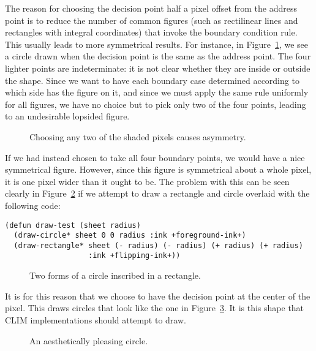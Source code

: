 The reason for choosing the decision point half a pixel offset from the address
point is to reduce the number of common figures (such as rectilinear lines and
rectangles with integral coordinates) that invoke the boundary condition rule.
This usually leads to more symmetrical results.  For instance, in
Figure~\ref{corner-circle}, we see a circle drawn when the decision point is the
same as the address point.  The four lighter points are indeterminate: it is not
clear whether they are inside or outside the shape.  Since we want to have each
boundary case determined according to which side has the figure on it, and since
we must apply the same rule uniformly for all figures, we have no choice but to
pick only two of the four points, leading to an undesirable lopsided figure.

\begin{figure}
\ifpsfig\centerline{}\else\vspace{2.5in}\fi
\caption{\label{corner-circle} Choosing any two of the shaded pixels causes asymmetry.}
\end{figure}

If we had instead chosen to take all four boundary points, we would have a nice
symmetrical figure.  However, since this figure is symmetrical about a whole
pixel, it is one pixel wider than it ought to be.  The problem with this can be
seen clearly in Figure~\ref{inscribed-circle} if we attempt to draw a rectangle
and circle overlaid with the following code:

\begin{verbatim}
(defun draw-test (sheet radius)
  (draw-circle* sheet 0 0 radius :ink +foreground-ink+)
  (draw-rectangle* sheet (- radius) (- radius) (+ radius) (+ radius)
                   :ink +flipping-ink+))
\end{verbatim}

\begin{figure}
\ifpsfig\centerline{}\else\vspace{2.5in}\fi
\caption{\label{inscribed-circle} Two forms of a circle inscribed in a rectangle.}
\end{figure}

It is for this reason that we choose to have the decision point at the center of
the pixel.  This draws circles that look like the one in
Figure~\ref{correct-circle}.  It is this shape that CLIM implementations should
attempt to draw.

\begin{figure}
\ifpsfig\centerline{}\else\vspace{2.5in}\fi
\caption{\label{correct-circle} An aesthetically pleasing circle.}
\end{figure}


